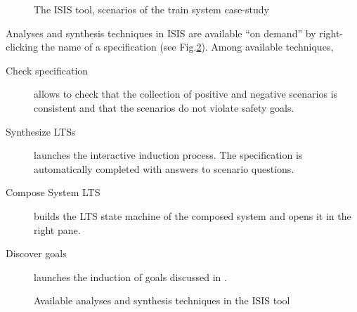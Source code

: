 \begin{figure}[H]
\centering{}
  \caption{The ISIS tool, scenarios of the train system case-study\label{image:isis-tool}}
\end{figure}

Analyses and synthesis techniques in ISIS are available ``on demand'' by right-clicking the name of a specification (see Fig.\ref{image:isis-tool-context}). Among available techniques,

\begin{description}
\item[Check specification] allows to check that the collection of positive and negative scenarios is consistent and that the scenarios do not violate safety goals.
\item[Synthesize LTSs] launches the interactive induction process. The specification is automatically completed with answers to scenario questions.
\item[Compose System LTS] builds the LTS state machine of the composed system and opens it in the right pane.
\item[Discover goals] launches the induction of goals discussed in \cite{Damas:2011}.
\end{description}

\begin{figure}[H]
\centering{}
  \caption{Available analyses and synthesis techniques in the ISIS tool\label{image:isis-tool-context}}
\end{figure}

